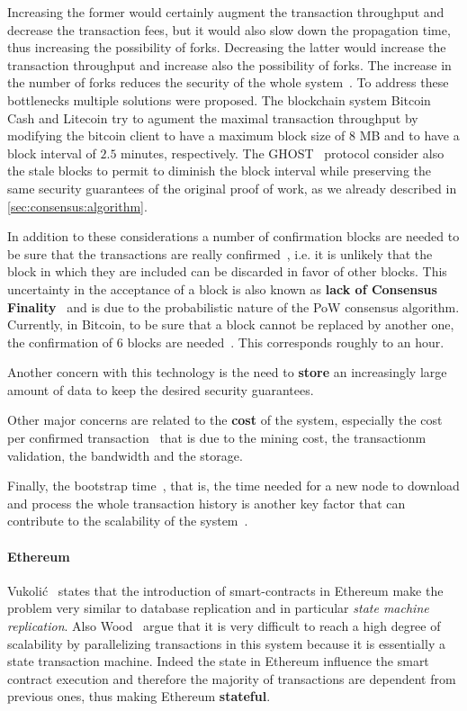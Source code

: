 Increasing the former would certainly augment the transaction throughput and
decrease the transaction fees, but it would also slow down the propagation
time, thus increasing the possibility of forks. 
Decreasing the latter would increase the transaction throughput and increase
also the possibility of forks.
The increase in the number of forks reduces the security of the whole 
system~\cite{bib:ghost}.
To address these bottlenecks multiple solutions were
proposed. The blockchain system Bitcoin Cash and Litecoin try to agument
the maximal transaction throughput by modifying the bitcoin client to
have a maximum block size of $8$ MB and to have a block interval of $2.5$
minutes, respectively. The GHOST~\cite{bib:ghost} protocol consider also
the stale blocks to permit to diminish the block interval while preserving
the same security guarantees of the original proof of work, as we already
described in \autoref{sec:consensus:algorithm}.


In addition to these considerations a number of confirmation blocks are
needed to be sure that the transactions are really 
confirmed~\cite{bib:taxonomy}, i.e. it is unlikely that the block in which
they are included can be discarded in favor of other blocks.
This uncertainty in the acceptance of a block is also known as
\textbf{lack of Consensus Finality}~\cite{bib:the-quest} and is due to the
probabilistic nature of the PoW consensus algorithm.
Currently, in Bitcoin, to be sure that a block cannot be replaced by another
one, the confirmation of 6 blocks are needed~\cite{bib:masteringbitcoin}.
This corresponds roughly to an hour.


Another concern with this technology is the need to \textbf{store} an
increasingly large amount of data to keep the desired security guarantees.

Other major concerns are related to the \textbf{cost} of the system, especially
the cost per confirmed transaction~\cite{bib:scaling-croman} that is due
to the mining cost, the transactionm validation, the bandwidth and the
storage.

Finally, the bootstrap time~\cite{bib:scaling-croman}, that is, the time
needed for a new node to download and process the whole transaction history
is another key factor that can contribute to the scalability of the
system~\cite{bib:scaling-croman}.

 
\paragraph{Ethereum} Vukoli\'c~\cite{bib:the-quest} states that the introduction
of smart-contracts 
in Ethereum make the problem very similar to database replication and in 
particular \emph{state machine replication}. Also Wood~\cite{wood2018ethereum}
argue that it is very difficult to reach a high degree of scalability by
parallelizing transactions in this system because it is essentially a state
transaction machine.
Indeed the state in Ethereum influence the smart contract execution and
therefore the majority of transactions are dependent from previous ones, thus
making Ethereum \textbf{stateful}.



